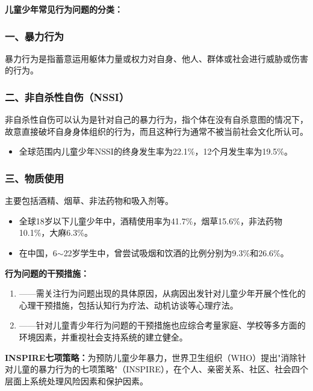 \begin{keybox}
\textbf{儿童少年常见行为问题的分类：}

\subsubsection*{一、暴力行为}

暴力行为是指蓄意运用躯体力量或权力对自身、他人、群体或社会进行威胁或伤害的行为。

\subsubsection*{二、非自杀性自伤（NSSI）}

非自杀性自伤可以认为是针对自己的暴力行为，指个体在没有自杀意图的情况下，故意直接破坏自身身体组织的行为，而且这种行为通常不被当前社会文化所认可。

\begin{itemize}[leftmargin=*]
    \item 全球范围内儿童少年NSSI的终身发生率为22.1\%，12个月发生率为19.5\%。
\end{itemize}

\subsubsection*{三、物质使用}

主要包括酒精、烟草、非法药物和吸入剂等。

\begin{itemize}[leftmargin=*]
    \item 全球18岁以下儿童少年中，酒精使用率为41.7\%，烟草15.6\%，非法药物10.1\%，大麻6.3\%。
    \item 在中国，6$\sim$22岁学生中，曾尝试吸烟和饮酒的比例分别为9.3\%和26.6\%。
\end{itemize}
\end{keybox}

\begin{tipbox}
\textbf{行为问题的干预措施：}

\begin{enumerate}[leftmargin=*]
    \item {}——需关注行为问题出现的具体原因，从病因出发针对儿童少年开展个性化的心理干预措施，包括认知行为疗法、动机访谈等心理疗法。
    \item {}——针对儿童青少年行为问题的干预措施也应综合考量家庭、学校等多方面的环境因素，并重视社会支持系统的建立健全。
\end{enumerate}

\vspace{4pt}
\textbf{INSPIRE七项策略：}为预防儿童少年暴力，世界卫生组织（WHO）提出"消除针对儿童的暴力行为的七项策略"（INSPIRE），在个人、亲密关系、社区、社会四个层面上系统处理风险因素和保护因素。
\end{tipbox}

